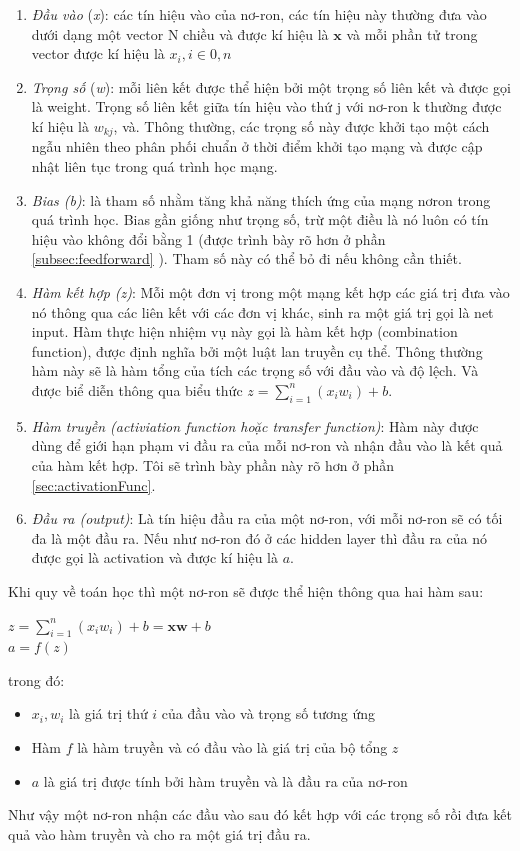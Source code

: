 \begin{enumerate}
\setlength{\itemindent}{5mm}
	\item \textit{Đầu vào} (\textit{x}): các tín hiệu vào của nơ-ron, các tín hiệu này thường đưa vào dưới dạng một vector N chiều và được kí hiệu là $\textbf{x}$ và mỗi phần tử trong vector được kí hiệu là $x_i, i\in{0,n}$
	\item \textit{Trọng số} (\textit{w}): mỗi liên kết được thể hiện bởi một trọng số liên kết và được gọi là weight. Trọng số liên kết giữa tín hiệu vào thứ j với nơ-ron k thường được kí hiệu là $w_{kj}$, và. Thông thường, các trọng số này được khởi tạo một cách ngẫu nhiên theo phân phối chuẩn ở thời điểm khởi tạo mạng và được cập nhật liên tục trong quá trình học mạng.

	\item \textit{Bias (b)}: là tham số nhằm tăng khả năng thích ứng của mạng nơron trong quá trình học. Bias gần giống như trọng số, trừ một điều là nó luôn có tín hiệu vào không đổi bằng 1 (được trình bày rõ hơn ở phần \ref{subsec:feedforward} ). Tham số này có thể bỏ đi nếu không cần thiết.	
	
	\item \textit{Hàm kết hợp  (z)}: Mỗi một đơn vị trong một mạng kết hợp các giá trị đưa vào nó thông qua các liên kết với các đơn vị khác, sinh ra một giá trị gọi là net input. Hàm thực hiện nhiệm vụ này  gọi là hàm kết hợp (combination function), được định nghĩa bởi một luật lan truyền cụ thể. Thông thường hàm này sẽ là hàm tổng của tích các trọng số với đầu vào và độ lệch. Và được biể diễn thông qua biểu thức $z = \sum_{i=1}^n(x_iw_i) +b$.
	\item \textit{Hàm truyền (activiation function hoặc transfer function)}: Hàm này được dùng để giới hạn phạm vi đầu ra của mỗi nơ-ron và nhận đầu vào là kết quả của hàm kết hợp. Tôi sẽ trình bày phần này rõ hơn ở phần \ref{sec:activationFunc}.
	\item \textit{Đầu ra (output)}: Là tín hiệu đầu ra của một nơ-ron, với mỗi nơ-ron sẽ có tối đa là một đầu ra. Nếu như nơ-ron đó ở các hidden layer thì đầu ra của nó được gọi là activation và được kí hiệu là $a$.
\end{enumerate} \par
Khi quy về toán học thì một nơ-ron sẽ được thể hiện thông qua hai hàm sau:
\begin{center}
$z = \sum_{i=1}^n(x_iw_i)+b = \textbf{x}\textbf{w}+b$\\[5pt]
$a = f(z)$
\end{center}
trong đó:
\begin{itemize}
\setlength{\itemindent}{5mm}
	\item[\textendash] $x_i,w_i$ là giá trị thứ $i$ của đầu vào và trọng số tương ứng
	\item[\textendash] Hàm $f$ là hàm truyền và có đầu vào là giá trị của bộ tổng $z$
	\item[\textendash] $a$ là giá trị được tính bởi hàm truyền và là đầu ra của nơ-ron
\end{itemize}
\par
Như vậy một nơ-ron nhận các đầu vào sau đó kết hợp với các trọng số rồi đưa kết quả vào hàm truyền và cho ra một giá trị đầu ra.

